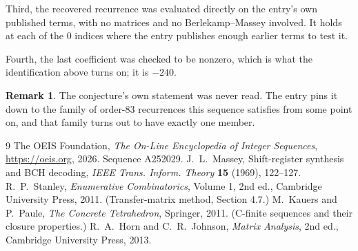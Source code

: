 \documentclass[11pt,a4paper]{article}
\theoremstyle{plain}
\theoremstyle{definition}
\newtheorem{remark}[theorem]{Remark}
\begin{document}
Third, the recovered recurrence was evaluated directly on the entry's own published terms, with
no matrices and no Berlekamp--Massey involved. It holds at each of the $0$ indices where
the entry publishes enough earlier terms to test it.

Fourth, the last coefficient was checked to be nonzero, which is what the identification above
turns on; it is $-240$.

\begin{remark}
The conjecture's own statement was never read. The entry pins it down to the family of
order-$83$ recurrences this sequence satisfies from some point on, and that family turns
out to have exactly one member.
\end{remark}

\begin{thebibliography}{9}
 The OEIS Foundation, \emph{The On-Line Encyclopedia of Integer
Sequences}, \url{https://oeis.org}, 2026. Sequence A252029.
 J.~L.~Massey, Shift-register synthesis and BCH decoding, \emph{IEEE
Trans. Inform. Theory} \textbf{15} (1969), 122--127.
 R.~P.~Stanley, \emph{Enumerative Combinatorics}, Volume 1, 2nd ed.,
Cambridge University Press, 2011. (Transfer-matrix method, Section 4.7.)
 M.~Kauers and P.~Paule, \emph{The Concrete Tetrahedron}, Springer, 2011.
(C-finite sequences and their closure properties.)
 R.~A.~Horn and C.~R.~Johnson, \emph{Matrix Analysis}, 2nd ed., Cambridge
University Press, 2013.
\end{thebibliography}
\end{document}
